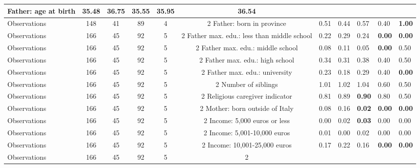 \begin{tabular}{l c c c c c c }
Father: age at birth &     35.48 &     36.75 &     35.55 &     35.95 &     36.54 \\
\midrule
Observations &       148 &        41 &        89 &         4 &         2
Father: born in province &      0.51 &      0.44 &      0.57 &      0.40 & \textbf{     1.00} \\
\midrule
Observations &       166 &        45 &        92 &         5 &         2
Father max. edu.: less than middle school &      0.22 &      0.29 &      0.24 & \textbf{     0.00} & \textbf{     0.00} \\
\midrule
Observations &       166 &        45 &        92 &         5 &         2
Father max. edu.: middle school &      0.08 &      0.11 &      0.05 & \textbf{     0.00} &      0.50 \\
\midrule
Observations &       166 &        45 &        92 &         5 &         2
Father max. edu.: high school &      0.34 &      0.31 &      0.38 &      0.40 &      0.50 \\
\midrule
Observations &       166 &        45 &        92 &         5 &         2
Father max. edu.: university &      0.23 &      0.18 &      0.29 &      0.40 & \textbf{     0.00} \\
\midrule
Observations &       166 &        45 &        92 &         5 &         2
Number of siblings &      1.01 &      1.02 &      1.04 &      0.60 &      0.50 \\
\midrule
Observations &       166 &        45 &        92 &         5 &         2
Religious caregiver indicator &      0.81 &      0.89 & \textbf{     0.90} &      0.80 &      0.50 \\
\midrule
Observations &       166 &        45 &        92 &         5 &         2
Mother: born outside of Italy &      0.08 &      0.16 & \textbf{     0.02} & \textbf{     0.00} & \textbf{     0.00} \\
\midrule
Observations &       166 &        45 &        92 &         5 &         2
Income: 5,000 euros or less &      0.00 &      0.02 & \textbf{     0.03} &      0.00 &      0.00 \\
\midrule
Observations &       166 &        45 &        92 &         5 &         2
Income: 5,001-10,000 euros &      0.01 &      0.00 &      0.02 &      0.00 &      0.00 \\
\midrule
Observations &       166 &        45 &        92 &         5 &         2
Income: 10,001-25,000 euros &      0.17 &      0.22 &      0.16 & \textbf{     0.00} & \textbf{     0.00} \\
\midrule
Observations &       166 &        45 &        92 &         5 &         2

\end{tabular}
